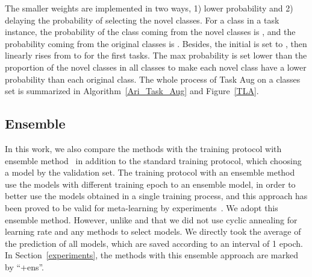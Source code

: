 \documentclass[10pt,twocolumn,letterpaper]{article}
\begin{document}
The smaller weights are implemented in two ways, 1) lower probability and 2) delaying the probability of selecting the novel classes. For a class in a task instance, the probability of the class coming from the novel classes is , and the probability coming from the original classes is . Besides, the initial  is set to , then linearly rises from  to  for the first  tasks. The max probability  is set lower than the proportion of the novel classes in all classes to make each novel class have a lower probability than each original class. The whole process of Task Aug on a classes set is summarized in Algorithm~\ref{Ari_Task_Aug} and Figure~\ref{TLA}.

\subsection{Ensemble}
In this work, we also compare the methods with the training protocol with ensemble method~\cite{huang2017snapshot} in addition to the standard training protocol, which choosing a model by the validation set. The training protocol with an ensemble method use the models with different training epoch to an ensemble model, in order to better use the models obtained in a single training process, and this approach has been proved to be valid for meta-learning by experiments~\cite{liu2018learning}. We adopt this ensemble method. However, unlike \cite{huang2017snapshot} and \cite{liu2018learning} that we did not use cyclic annealing for learning rate and any methods to select models. We directly took the average of the prediction of all models, which are saved according to an interval of 1 epoch. In Section~\ref{experiments}, the methods with this ensemble approach are marked by ``+ens''.
\end{document}
